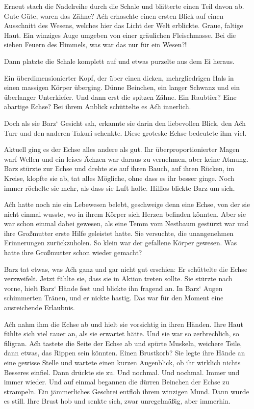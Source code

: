 Erneut stach die Nadelreihe durch die Schale und blätterte einen Teil davon ab. Gute Güte, waren das Zähne? Aćh erhaschte einen ersten Blick auf einen Ausschnitt des Wesens, welches hier das Licht der Welt erblickte. Graue, faltige Haut. Ein winziges Auge umgeben von einer gräulichen Fleischmasse. Bei die sieben Feuern des Himmels, was war das nur für ein Wesen?!

Dann platzte die Schale komplett auf und etwas purzelte aus dem Ei heraus.

Ein überdimensionierter Kopf, der über einen dicken, mehrgliedrigen Hals in einen massigen Körper überging. Dünne Beinchen, ein langer Schwanz und ein überlanger Unterkiefer. Und dann erst die spitzen Zähne. Ein Raubtier? Eine abartige Echse? Bei ihrem Anblick schüttelte es Aćh innerlich.

Doch als sie Barz‘ Gesicht sah, erkannte sie darin den liebevollen Blick, den Aćh Turr und den anderen Takuri schenkte. Diese groteske Echse bedeutete ihm viel.

Aktuell ging es der Echse alles andere als gut. Ihr überproportionierter Magen warf Wellen und ein leises Ächzen war daraus zu vernehmen, aber keine Atmung. Barz stürzte zur Echse und drehte sie auf ihren Bauch, auf ihren Rücken, im Kreise, klopfte sie ab, tat alles Mögliche, ohne dass es ihr besser ginge. Noch immer röchelte sie mehr, als dass sie Luft holte. Hilflos blickte Barz um sich.

Aćh hatte noch nie ein Lebewesen belebt, geschweige denn eine Echse, von der sie nicht einmal wusste, wo in ihrem Körper sich Herzen befinden könnten. Aber sie war schon einmal dabei gewesen, als eine Temm vom Nestbaum gestürzt war und ihre Großmutter erste Hilfe geleistet hatte. Sie versuchte, die unangenehmen Erinnerungen zurückzuholen. So klein war der gefallene Körper gewesen. Was hatte ihre Großmutter schon wieder gemacht?

Barz tat etwas, was Aćh ganz und gar nicht gut erschien: Er schüttelte die Echse verzweifelt. Jetzt fühlte sie, dass sie in Aktion treten sollte. Sie stürzte nach vorne, hielt Barz‘ Hände fest und blickte ihn fragend an. In Barz‘ Augen schimmerten Tränen, und er nickte hastig. Das war für den Moment eine ausreichende Erlaubnis.

Aćh nahm ihm die Echse ab und hielt sie vorsichtig in ihren Händen. Ihre Haut fühlte sich viel rauer an, als sie erwartet hätte. Und sie war so zerbrechlich, so filigran. Aćh tastete die Seite der Echse ab und spürte Muskeln, weichere Teile, dann etwas, das Rippen sein könnten. Einen Brustkorb? Sie legte ihre Hände an eine gewisse Stelle und wartete einen kurzen Augenblick, ob ihr wirklich nichts Besseres einfiel. Dann drückte sie zu. Und nochmal. Und nochmal. Immer und immer wieder. Und auf einmal begannen die dürren Beinchen der Echse zu strampeln. Ein jämmerliches Geschrei entfloh ihrem winzigen Mund. Dann wurde es still. Ihre Brust hob und senkte sich, zwar unregelmäßig, aber immerhin.

